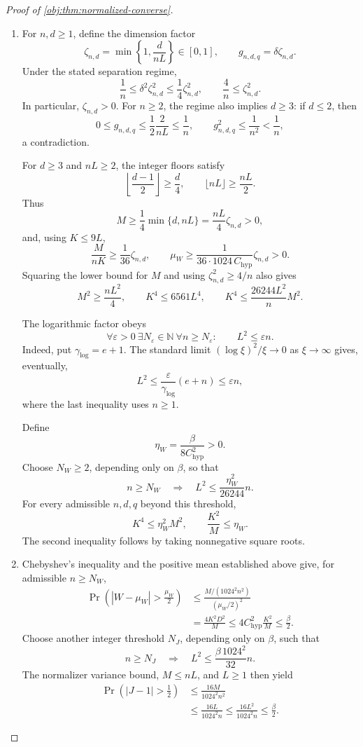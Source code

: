 \documentclass[11pt]{article}
\begin{document}
\begin{proof}[Proof of \cref{obj:thm:normalized-converse}]
\begin{enumerate}
\item
For \(n,d\ge1\), define the dimension factor
\[
\zeta_{n,d}
=\min\left\{1,\frac d{nL}\right\}\in[0,1],
\qquad
g_{n,d,q}=\delta\zeta_{n,d}.
\]
Under the stated separation regime,
\[
\frac1n\le\delta^2\zeta_{n,d}^2
\le\frac14\zeta_{n,d}^2,
\qquad
\frac4n\le\zeta_{n,d}^2.
\]
In particular, \(\zeta_{n,d}>0\). For \(n\ge2\), the regime also implies \(d\ge3\): if \(d\le2\), then
\[
0\le g_{n,d,q}
\le\frac12\frac2{nL}\le\frac1n,
\qquad
g_{n,d,q}^2\le\frac1{n^2}<\frac1n,
\]
a contradiction.

For \(d\ge3\) and \(nL\ge2\), the integer floors satisfy
\[
\left\lfloor\frac{d-1}{2}\right\rfloor\ge\frac d4,
\qquad
\lfloor nL\rfloor\ge\frac{nL}{2}.
\]
Thus
\[
M\ge\frac14\min\{d,nL\}
=\frac{nL}{4}\zeta_{n,d}>0,
\]
and, using \(K\le9L\),
\[
\frac{M}{nK}\ge\frac1{36}\zeta_{n,d},
\qquad
\mu_W\ge
\frac1{36\cdot1024\,C_{\mathrm{hyp}}}\zeta_{n,d}>0.
\]
Squaring the lower bound for \(M\) and using
\(\zeta_{n,d}^2\ge4/n\) also gives
\[
M^2\ge\frac{nL^2}{4},
\qquad
K^4\le6561L^4,
\qquad
K^4\le\frac{26244L^2}{n}M^2.
\]

The logarithmic factor obeys
\[
\forall\varepsilon>0\ \exists N_\varepsilon\in\mathbb N\
\forall n\ge N_\varepsilon:
\qquad L^2\le\varepsilon n.
\]
Indeed, put \(\gamma_{\log}=e+1\). The standard limit
\((\log \xi)^2/\xi\to0\) as \(\xi\to\infty\) gives, eventually,
\[
L^2\le\frac{\varepsilon}{\gamma_{\log}}(e+n)
\le\varepsilon n,
\]
where the last inequality uses \(n\ge1\).

Define
\[
\eta_W=\frac{\beta}{8C_{\mathrm{hyp}}^2}>0.
\]
Choose \(N_W\ge2\), depending only on \(\beta\), so that
\[
n\ge N_W
\quad\Longrightarrow\quad
L^2\le\frac{\eta_W^2}{26244}n.
\]
For every admissible \(n,d,q\) beyond this threshold,
\[
K^4\le\eta_W^2M^2,
\qquad
\frac{K^2}{M}\le\eta_W.
\]
The second inequality follows by taking nonnegative square roots.

\item
Chebyshev's inequality and the positive mean established above give, for admissible \(n\ge N_W\),
\[
\begin{aligned}
\Pr\left(|W-\mu_W|>\frac{\mu_W}{2}\right)
&\le
\frac{M/(1024^2n^2)}{(\mu_W/2)^2}\\
&=\frac{4K^2D^2}{M}
\le4C_{\mathrm{hyp}}^2\frac{K^2}{M}
\le\frac\beta2.
\end{aligned}
\]
Choose another integer threshold \(N_J\), depending only on \(\beta\), such that
\[
n\ge N_J
\quad\Longrightarrow\quad
L^2\le\frac{\beta\,1024^2}{32}n.
\]
The normalizer variance bound, \(M\le nL\), and \(L\ge1\) then yield
\[
\begin{aligned}
\Pr\left(|J-1|>\frac12\right)
&\le\frac{16M}{1024^2n^2}\\
&\le\frac{16L}{1024^2n}
\le\frac{16L^2}{1024^2n}
\le\frac\beta2.
\end{aligned}
\]


\end{enumerate}
\end{proof}
\end{document}
